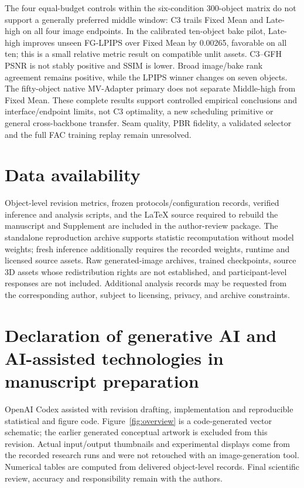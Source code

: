 \documentclass[times,twocolumn,final]{elsarticle}
\providecommand{\DIFadd}[1]{{\protect\color{blue} \sf #1}} %
\providecommand{\DIFaddbegin}{} %
\providecommand{\DIFaddend}{} %
\begin{document}
  \DIFaddbegin \DIFadd{The four equal-budget controls within the six-condition 300-object matrix do not support a generally preferred middle window: C3 trails Fixed Mean and Late-high on all four image endpoints. In the calibrated ten-object bake pilot, Late-high improves unseen FG-LPIPS over Fixed Mean by 0.00265, favorable on all ten; this is a small relative metric result on compatible unlit assets. C3--GFH PSNR is not stably positive and SSIM is lower. Broad image/bake rank agreement remains positive, while the LPIPS winner changes on seven objects. The fifty-object native MV-Adapter primary does not separate Middle-high from Fixed Mean. These complete results support controlled empirical conclusions and interface/endpoint limits, not C3 optimality, a new scheduling primitive or general cross-backbone transfer. Seam quality, PBR fidelity, a validated selector and }\DIFaddend the   \DIFaddbegin \DIFadd{full FAC training replay remain unresolved.
}\DIFaddend 

\section*{Data availability}

  \DIFaddbegin \DIFadd{Object-level revision metrics, frozen protocols/configuration records, verified inference and analysis scripts, and the LaTeX source required to rebuild the manuscript and Supplement are included in the author-review package. The standalone reproduction archive supports statistic recomputation without model weights; fresh inference additionally requires the recorded weights, runtime and licensed source assets. Raw generated-image archives, trained checkpoints, source 3D assets whose redistribution rights are not established, and participant-level responses are not included. Additional analysis records may be requested from the corresponding author, subject to licensing, privacy, and archive constraints.
}

\section*{\DIFadd{Declaration of generative AI and AI-assisted technologies in manuscript preparation}}
\DIFadd{OpenAI Codex assisted with revision drafting, implementation and reproducible statistical and figure code. Figure~\ref{fig:overview} is a code-generated vector schematic; the earlier generated conceptual artwork is excluded from this revision. Actual input/output thumbnails and experimental displays come from the recorded research runs and were not retouched with an image-generation tool. Numerical tables are computed from delivered object-level records. Final scientific review, accuracy and responsibility remain with the authors}\DIFaddend .
\end{document}
